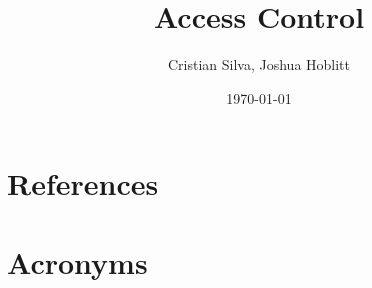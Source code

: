 \documentclass[PMO,authoryear,lsstdraft,toc]{lsstdoc}
\title{Access Control}
\author{%
Cristian Silva, Joshua Hoblitt
}
\date{\today}
\begin{document}
\maketitle




\appendix
\section{References} \label{sec:bib}
\renewcommand{\refname}{} %


\section{Acronyms} \label{sec:acronyms}

\end{document}
